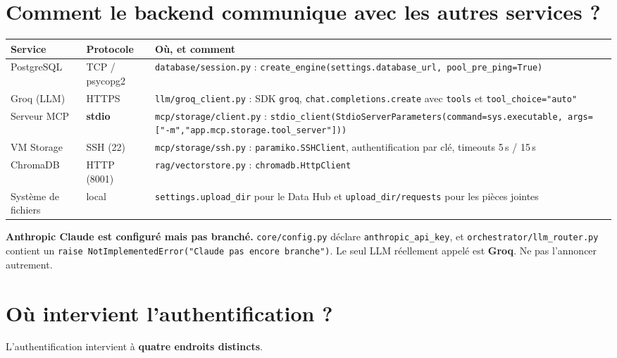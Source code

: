 \documentclass[11pt,a4paper]{report}
\newcommand{\file}[1]{\texttt{\small #1}}
\newcommand{\fn}[1]{\texttt{\small\textcolor{oasisviolet}{#1}}}
\begin{document}
\section{Comment le backend communique avec les autres services ?}

\begin{longtable}{@{}p{2.9cm}p{2.9cm}p{8.6cm}@{}}
\toprule
\textbf{Service} & \textbf{Protocole} & \textbf{Où, et comment}\\
\midrule
\endhead
PostgreSQL & TCP / psycopg2 & \file{database/session.py} : \fn{create\_engine(settings.database\_url, pool\_pre\_ping=True)}\\
Groq (LLM) & HTTPS & \file{llm/groq\_client.py} : SDK \texttt{groq}, \fn{chat.completions.create} avec \texttt{tools} et \texttt{tool\_choice="auto"}\\
Serveur MCP & \textbf{stdio} & \file{mcp/storage/client.py} : \fn{stdio\_client(StdioServerParameters(command=sys.executable, args=["-m","app.mcp.storage.tool\_server"]))}\\
VM Storage & SSH (22) & \file{mcp/storage/ssh.py} : \texttt{paramiko.SSHClient}, authentification par clé, timeouts 5\,s / 15\,s\\
ChromaDB & HTTP (8001) & \file{rag/vectorstore.py} : \fn{chromadb.HttpClient}\\
Système de fichiers & local & \file{settings.upload\_dir} pour le Data Hub et \file{upload\_dir/requests} pour les pièces jointes\\
\bottomrule
\end{longtable}

\begin{infobox}
\textbf{Anthropic Claude est configuré mais pas branché.} \file{core/config.py}
déclare \texttt{anthropic\_api\_key}, et \file{orchestrator/llm\_router.py}
contient un \texttt{raise NotImplementedError("Claude pas encore branche")}. Le
seul LLM réellement appelé est \textbf{Groq}. Ne pas l'annoncer autrement.
\end{infobox}

\section{Où intervient l'authentification ?}

L'authentification intervient à \textbf{quatre endroits distincts}.
\end{document}
